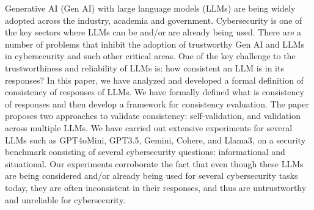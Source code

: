 Generative AI (Gen AI) with large language models (LLMs) are being widely adopted across the industry, academia and government. Cybersecurity is one of the key sectors where LLMs can be and/or are already being used. There are a number of problems that inhibit the adoption of trustworthy Gen AI and LLMs in cybersecurity and such other critical areas. One of the key challenge to the trustworthiness and reliability of LLMs is: how consistent an LLM is in its responses? In this paper, we have analyzed and developed a formal definition of consistency of responses of LLMs. We have formally defined what is consistency of responses and then develop a framework for consistency evaluation. The paper proposes two approaches to validate consistency: self-validation, and validation across multiple LLMs. We have carried out extensive experiments for several LLMs such as GPT4oMini, GPT3.5, Gemini, Cohere, and Llama3, on a security benchmark consisting of several cybersecurity questions: informational and situational. Our experiments corroborate the fact that even though these LLMs are being considered and/or already being used for several cybersecurity tasks today, they are often inconsistent in their responses, and thus are untrustworthy and unreliable for cybersecurity.

